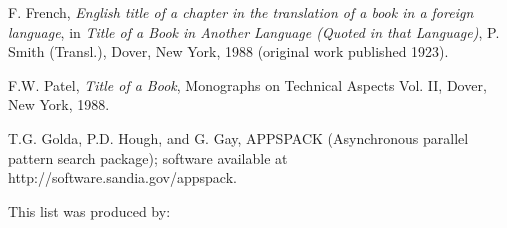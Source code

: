 \documentclass[]{tMAM2e}
\begin{document}
\begin{thebibliography}{10}
F. French, {\em{English title of a chapter in the translation of a book in a foreign language}}, in {\itshape Title
of a Book in Another Language (Quoted in that Language)}, P. Smith (Transl.), Dover, New York, 1988 (original work
published 1923).

F.W. Patel, {\itshape Title of a Book}, Monographs on Technical Aspects Vol. II, Dover, New York, 1988.

T.G. Golda, P.D. Hough, and G. Gay, APPSPACK (Asynchronous parallel pattern search package); software available
at http://software.sandia.gov/appspack.
\end{thebibliography}
\medskip
\noindent This list was produced by:
\vspace{6pt}
\end{document}
